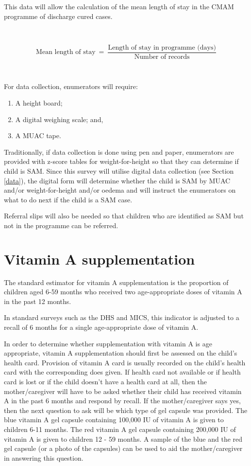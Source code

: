\documentclass[12pt,a4paper]{book}
\theoremstyle{definition}
\theoremstyle{definition}
\theoremstyle{definition}
\theoremstyle{remark}
\begin{document}
This data will allow the calculation of the mean length of stay in the
CMAM programme of discharge cured cases.

~

\[ \text{Mean length of stay} ~ = ~ \frac{\text{Length of stay in programme (days)}}{\text{Number of records}} \]

~

For data collection, enumerators will require:

\begin{enumerate}
\def\labelenumi{\arabic{enumi}.}
\item
  A height board;
\item
  A digital weighing scale; and,
\item
  A MUAC tape.
\end{enumerate}

Traditionally, if data collection is done using pen and paper,
enumerators are provided with z-score tables for weight-for-height so
that they can determine if child is SAM. Since this survey will utilise
digital data collection (see Section \ref{data}), the digital form will
determine whether the child is SAM by MUAC and/or weight-for-height
and/or oedema and will instruct the enumerators on what to do next if
the child is a SAM case.

Referral slips will also be needed so that children who are identified
as SAM but not in the programme can be referred.

\hypertarget{vitamin-a-supplementation}{%
\section{Vitamin A supplementation}\label{vitamin-a-supplementation}}

The standard estimator for vitamin A supplementation is the proportion
of children aged 6-59 months who received two age-appropriate doses of
vitamin A in the past 12 months.

In standard surveys such as the DHS and MICS, this indicator is adjusted
to a recall of 6 months for a single age-appropriate dose of vitamin A.

In order to determine whether supplementation with vitamin A is age
appropriate, vitamin A supplementation should first be assessed on the
child's health card. Provision of vitamin A card is usually recorded on
the child's health card with the corresponding does given. If health
card not available or if health card is lost or if the child doesn't
have a health card at all, then the mother/caregiver will have to be
asked whether their child has received vitamin A in the past 6 months
and respond by recall. If the mother/caregiver says yes, then the next
question to ask will be which type of gel capsule was provided. The blue
vitamin A gel capsule containing 100,000 IU of vitamin A is given to
children 6-11 months. The red vitamin A gel capsule containing 200,000
IU of vitamin A is given to children 12 - 59 months. A sample of the
blue and the red gel capsule (or a photo of the capsules) can be used to
aid the mother/caregiver in answering this question.
\end{document}
